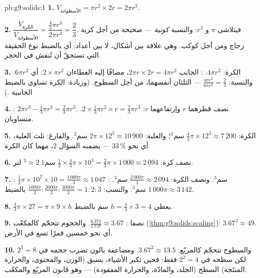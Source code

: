 \begin{solution}{pb:g9:solids:1}
\textbf{1.} $V_{\text{الأسطوانة}} = \pi r^2 \times 2r = 2\pi r^3$.

\textbf{2.} $\dfrac{V_{\text{الكرة}}}{V_{\text{الأسطوانة}}}
= \dfrac{\frac43 \pi r^3}{2 \pi r^3} = \dfrac23$. فيتلاشى $\pi$
و $r^3$: والنسبة \emph{كونية} --- صحيحة من أجل كرية زجاج ومن
أجل كوكب. وهي علاقة بين أشكال، لا بين أعداد: أي بالضبط نوع
الحقيقة التي تستحقّ أن تُنقش في الحجر.

\textbf{3.} الكرة: $4\pi r^2$. : الجانب
$2\pi r \times 2r = 4\pi r^2$، مضافًا إليه الغطاءان
$2 \times \pi r^2$: أي  $6\pi r^2$. والنسبة:
$\frac{4\pi r^2}{6\pi r^2} = \frac23$ --- الثلثان أنفسهما،
من أجل السطوح. (وزيادة:  الكرة تساوي بالضبط
 الجانبية .)

\textbf{4.} : $2\pi r^3 - \frac43\pi r^3 =
\frac23 \pi r^3$.  نصف قطرهما $r$ واِرتفاعهما $r$:
$2 \times \frac13 \pi r^2 \times r = \frac23 \pi r^3$. متساويان.

\textbf{5.} الكرة: $\frac43 \pi \times 12^3 \approx 7\,200$
سم$^3$؛ والعلبة: $2\pi \times 12^3 \approx 10\,900$ سم$^3$.
والفارغ: ثلث العلبة، أي نحو $33\,\%$ --- يضمنه
السؤال 2، مهما كان  الكرة.

\textbf{6.} نصف كرة:
$\frac12 \times \frac43 \pi \times 10^3 = \frac23 \pi \times
1\,000 \approx 2\,094$ سم$^3 \approx 2.1$ لتر.

\textbf{7.} : $\frac13 \pi \times 10^2 \times 10 =
\frac{1\,000\pi}{3} \approx 1\,047$ سم$^3$. ونصف الكرة:
$\frac{2\,000\pi}{3} \approx 2\,094$ سم$^3$. :
$1\,000\pi \approx 3\,142$ سم$^3$. والنسب:
$\frac{1000\pi}{3} : \frac{2000\pi}{3} : \frac{3000\pi}{3}
= 1 : 2 : 3$ بالضبط.

\textbf{8.} $\frac43 \pi \times 27 = \pi \times 9 \times h$
يعطي $h = \frac43 \times 3 = 4$ سم بالضبط.

\textbf{9.} نصفا : $\frac{6\,371}{1\,737} \approx 3.67$.
والحجوم تتحجّم كالمكعّب (\cref{thm:g9:solids:scaling}):
$3.67^3 \approx 49$. أي نحو خمسين قمرًا تسع في الأرض.

\textbf{10.} والسطوح تتحجّم كالمربّع: $3.67^2 \approx
13.5$. ومضاعفة  بالون تضرب حجمه في
$2^3 = 8$ لكن سطحه في $2^2 = 4$ فقط: فحين تكبر الأشياء، يسبق
 (الوزن، والمحتوى، والحرارة المنتَجة) السطح (الجلد،
والمادّة، والحرارة المفقودة) --- وهو قانون المربّع والمكعّب.


\end{solution}
